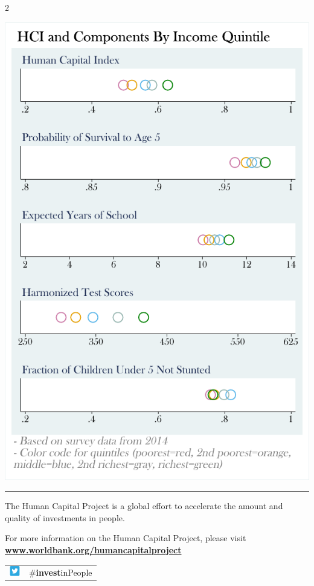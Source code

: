 \documentclass[8pt,]{article}
\begin{document}
\begin {multicols}{2}
\begin{flushright}\includegraphics[width=1\linewidth]{charts/ses_EGY} \end{flushright}

\noindent

\rule{9cm}{0.4pt}

The Human Capital Project is a global effort to accelerate the amount
and quality of investments in people. ~

For more information on the Human Capital Project, please visit
\textbf{\href{https://www.worldbank.org/humancapitalproject}{www.worldbank.org/humancapitalproject}}

\begin{table}[H]
\begin{tabular}{ll}
\includegraphics[width=0.5cm]{static/twitter.png} & \#\textbf{invest}inPeople   \\
\end{tabular}
\end{table}

\end {multicols}
\end{document}
